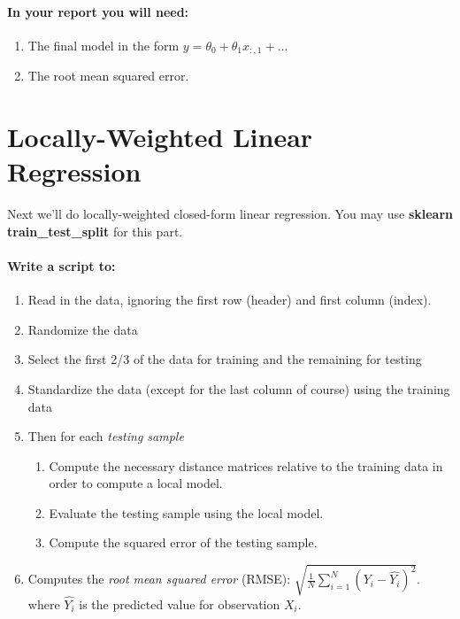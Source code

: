 \documentclass[12pt]{article}
\begin{document}
\paragraph{In your report you will need:}
\begin{enumerate}
\item The final model in the form $y=\theta_0+\theta_1x_{:,1} + ...$
\item The root mean squared error.
\end{enumerate}


\newpage
\section{Locally-Weighted Linear Regression}
\noindent
Next we'll do locally-weighted closed-form linear regression.  You may use \textbf{sklearn train\_test\_split} for this part.\\

\paragraph{Write a script to:}
\begin{enumerate}
  \item Read in the data, ignoring the first row (header) and first column (index).
  \item Randomize the data
  \item Select the first 2/3 of the data for training and the remaining for testing
  \item Standardize the data (except for the last column of course) using the training data
  \item Then for each \emph{testing sample}
  	\begin{enumerate}
  	\item Compute the necessary distance matrices relative to the training data in order to compute a local model.
  	\item Evaluate the testing sample using the local model.
  	\item Compute the squared error of the testing sample.
  	\end{enumerate}
 \item Computes the \emph{root mean squared error} (RMSE): $\sqrt{\frac{1}{N}\sum_{i=1}^N (Y_i-\hat{Y_i})^2}$. where $\hat{Y_i}$ is the predicted value for observation $X_i$.
\end{enumerate}
\end{document}
